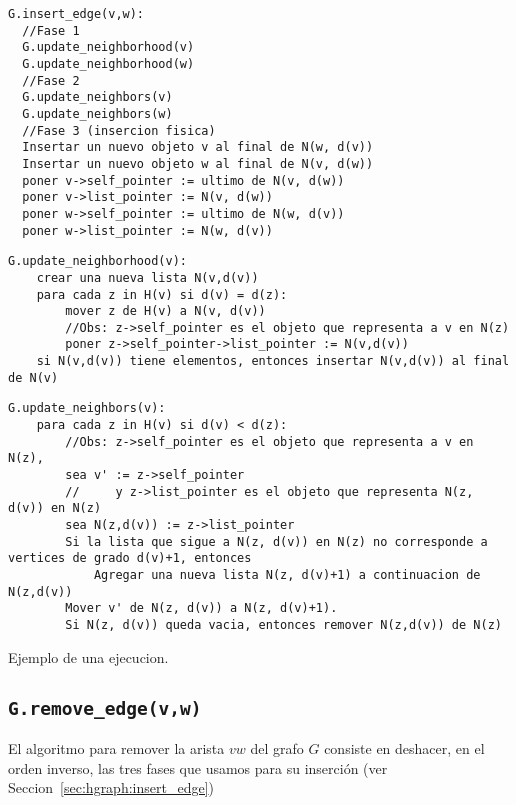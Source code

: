 \documentclass[a4paper,12pt]{article}
\begin{document}
\begin{lstlisting}
G.insert_edge(v,w):
  //Fase 1
  G.update_neighborhood(v)
  G.update_neighborhood(w)
  //Fase 2
  G.update_neighbors(v)
  G.update_neighbors(w)
  //Fase 3 (insercion fisica)
  Insertar un nuevo objeto v al final de N(w, d(v))
  Insertar un nuevo objeto w al final de N(v, d(w))
  poner v->self_pointer := ultimo de N(v, d(w))
  poner v->list_pointer := N(v, d(w))
  poner w->self_pointer := ultimo de N(w, d(v))
  poner w->list_pointer := N(w, d(v))
\end{lstlisting}

\begin{lstlisting}
G.update_neighborhood(v):
    crear una nueva lista N(v,d(v))
    para cada z in H(v) si d(v) = d(z):
        mover z de H(v) a N(v, d(v))
        //Obs: z->self_pointer es el objeto que representa a v en N(z)
        poner z->self_pointer->list_pointer := N(v,d(v))
    si N(v,d(v)) tiene elementos, entonces insertar N(v,d(v)) al final de N(v) 
\end{lstlisting}

\begin{lstlisting}
G.update_neighbors(v):
    para cada z in H(v) si d(v) < d(z):
        //Obs: z->self_pointer es el objeto que representa a v en N(z),
        sea v' := z->self_pointer
        //     y z->list_pointer es el objeto que representa N(z, d(v)) en N(z)
        sea N(z,d(v)) := z->list_pointer
        Si la lista que sigue a N(z, d(v)) en N(z) no corresponde a vertices de grado d(v)+1, entonces
            Agregar una nueva lista N(z, d(v)+1) a continuacion de N(z,d(v))
        Mover v' de N(z, d(v)) a N(z, d(v)+1).
        Si N(z, d(v)) queda vacia, entonces remover N(z,d(v)) de N(z)
\end{lstlisting}

Ejemplo de una ejecucion.

\subsection{\texttt{G.remove\_edge(v,w)}}
\label{sec:hgraph:remove_edge}

El algoritmo para remover la arista $vw$ del grafo $G$ consiste en deshacer, en el orden inverso, las tres fases que usamos para su inserción (ver Seccion~\ref{sec:hgraph:insert_edge})
\end{document}
